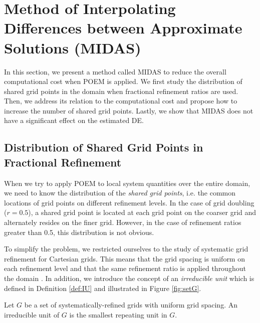 \section{Method of Interpolating Differences between Approximate Solutions (MIDAS)} \label{sec:MIDAS}
In this section, we present a method called MIDAS to reduce the overall computational cost when POEM is applied. We first study the distribution of shared grid points in the domain when fractional refinement ratios are used. Then, we address its relation to the computational cost and propose how to increase the number of shared grid points. Lastly, we show that MIDAS does not have a significant effect on the estimated DE.


\subsection{Distribution of Shared Grid Points in Fractional Refinement}
When we try to apply POEM to local system quantities over the entire domain, we need to know the distribution of the \textit{shared grid points}, i.e. the common locations of grid points on different refinement levels. In the case of grid doubling ($r=0.5$), a shared grid point is located at each grid point on the coarser grid and alternately resides on the finer grid. However, in the case of refinement ratios greater than 0.5, this distribution is not obvious.

To simplify the problem, we restricted ourselves to the study of systematic grid refinement for Cartesian grids. This means that the grid spacing is uniform on each refinement level and that the same refinement ratio is applied throughout the domain \citep{Roy2010}. In addition, we introduce the concept of an \textit{irreducible unit} which is defined in Definition \ref{def:IU} and illustrated in Figure \ref{fig:setG}.
\begin{definition} \label{def:IU}
    Let $G$ be a set of systematically-refined grids with uniform grid spacing. An irreducible unit of $G$ is the smallest repeating unit in $G$.
\end{definition}

